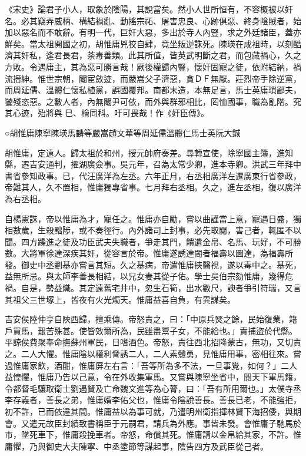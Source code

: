 
\begin{pinyinscope}
《宋史》論君子小人，取象於陰陽，其說當矣。然小人世所恒有，不容概被以奸名。必其竊弄威柄、構結禍亂、動搖宗祏、屠害忠良、心跡俱惡、終身陰賊者，始加以惡名而不敢辭。有明一代，巨奸大惡，多出於寺人內豎，求之外廷諸臣，蓋亦鮮矣。當太祖開國之初，胡惟庸兇狡自肆，竟坐叛逆誅死。陳瑛在成祖時，以刻酷濟其奸私，逢君長君，荼毒善類。此其所值，皆英武明斷之君，而包藏禍心，久之方敗。令遇庸主，其為惡可勝言哉！厥後權歸內豎，懷奸固寵之徒，依附結納，禍流搢紳。惟世宗朝，閹宦斂迹，而嚴嵩父子濟惡，貪ＤＦ無厭。莊烈帝手除逆黨，而周延儒、溫體仁懷私植黨，誤國覆邦。南都末造，本無足言，馬士英庸瑣鄙夫，饕殘恣惡。之數人者，內無閹尹可依，而外與群邪相比，罔恤國事，職為亂階。究其心迹，殆將與巳、檜同科。吁可畏哉！作《奸臣傳》。

○胡惟庸陳寧陳瑛馬麟等嚴嵩趙文華等周延儒溫體仁馬士英阮大鋮

胡惟庸，定遠人。歸太祖於和州，授元帥府奏差。尋轉宣使，除寧國主簿，進知縣，遷吉安通判，擢湖廣僉事。吳元年，召為太常少卿，進本寺卿。洪武三年拜中書省參知政事。已，代汪廣洋為左丞。六年正月，右丞相廣洋左遷廣東行省參政，帝難其人，久不置相，惟庸獨專省事。七月拜右丞相。久之，進左丞相，復以廣洋為右丞相。

自楊憲誅，帝以惟庸為才，寵任之。惟庸亦自勵，嘗以曲謹當上意，寵遇日盛，獨相數歲，生殺黜陟，或不奏徑行。內外諸司上封事，必先取閱，害己者，輒匿不以聞。四方躁進之徒及功臣武夫失職者，爭走其門，饋遺金帛、名馬、玩好，不可勝數。大將軍徐達深疾其奸，從容言於帝。惟庸遂誘達閽者福壽以圖達，為福壽所發。御史中丞劉基亦嘗言其短。久之基病，帝遣惟庸挾醫視，遂以毒中之。基死，益無所忌。與太師李善長相結，以兄女妻其從子佑。學士吳伯宗劾惟庸，幾得危禍。自是，勢益熾。其定遠舊宅井中，忽生石筍，出水數尺，諛者爭引符瑞，又言其祖父三世塚上，皆夜有火光燭天。惟庸益喜自負，有異謀矣。

吉安侯陸仲亨自陜西歸，擅乘傳。帝怒責之，曰：「中原兵燹之餘，民始復業，籍戶買馬，艱苦殊甚。使皆效爾所為，民雖盡鬻子女，不能給也。」責捕盜於代縣。平諒侯費聚奉命撫蘇州軍民，日嗜酒色。帝怒，責往西北招降蒙古，無功，又切責之。二人大懼。惟庸陰以權利脅誘二人，二人素戇勇，見惟庸用事，密相往來。嘗過惟庸家飲，酒酣，惟庸屏左右言：「吾等所為多不法，一旦事覺，如何？」二人益惶懼，惟庸乃告以己意，令在外收集軍馬。又嘗與陳寧坐省中，閱天下軍馬籍，令都督毛驤取衛士劉遇賢及亡命魏文進等為心膂，曰：「吾有所用爾也。」太僕寺丞李存義者，善長之弟，惟庸婿李佑父也，惟庸令陰說善長。善長已老，不能強拒，初不許，已而依違其間。惟庸益以為事可就，乃遣明州衛指揮林賢下海招倭，與期會。又遣元故臣封績致書稱臣于元嗣君，請兵為外應。事皆未發。會惟庸子馳馬於市，墜死車下，惟庸殺挽車者。帝怒，命償其死。惟庸請以金帛給其家，不許。惟庸懼，乃與御史大夫陳寧、中丞塗節等謀起事，陰告四方及武臣從己者。


\end{pinyinscope}
